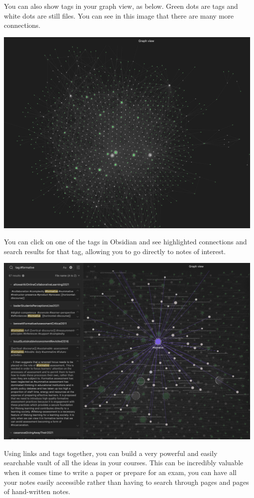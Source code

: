 \documentclass[
]{book}
\theoremstyle{definition}
\theoremstyle{definition}
\theoremstyle{definition}
\theoremstyle{definition}
\theoremstyle{remark}
\begin{document}
You can also show tags in your graph view, as below. Green dots are tags and white dots are still files. You can see in this image that there are many more connections.

\includegraphics{assets/u3/graph1.png}

You can click on one of the tags in Obsidian and see highlighted connections and search results for that tag, allowing you to go directly to notes of interest.

\includegraphics{assets/u3/graph3.png}

Using links and tags together, you can build a very powerful and easily searchable vault of all the ideas in your courses. This can be incredibly valuable when it comes time to write a paper or prepare for an exam, you can have all your notes easily accessible rather than having to search through pages and pages of hand-written notes.
\end{document}
